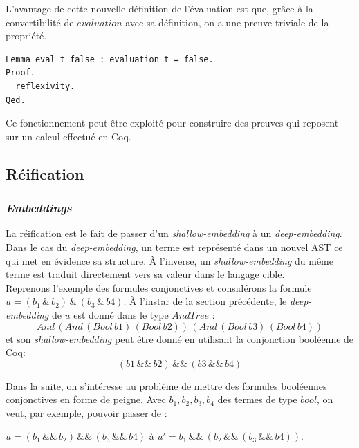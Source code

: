 \documentclass[11pt]{article}
\begin{document}
L'avantage de cette nouvelle définition de l'évaluation est que, grâce à la convertibilité de $evaluation$ avec sa définition, on a une preuve triviale de la propriété.
\begin{lstlisting}[frame=single]
Lemma eval_t_false : evaluation t = false.
Proof.
  reflexivity.
Qed.
\end{lstlisting}

Ce fonctionnement peut être exploité pour construire des preuves qui reposent sur un calcul effectué en Coq. 


\subsection{Réification} \label{reification}

\subsubsection{\textit{Embeddings}}

La réification est le fait de passer d'un \textit{shallow-embedding} à un \textit{deep-embedding}. \\

Dans le cas du \textit{deep-embedding}, un terme est représenté dans un nouvel AST ce qui met en évidence sa structure. À l'inverse, un \textit{shallow-embedding} du même terme est traduit directement vers sa valeur dans le langage cible. \\

Reprenons l'exemple des formules conjonctives et considérons la formule $ u = (b_1 \,\&\, b_2) \,\&\, (b_3 \,\&\, b4)$. À l'instar de la section précédente, le \textit{deep-embedding} de $u$ est donné dans le type $AndTree$ :
\[And\,(And\,(Bool\,b1)\,(Bool\,b2))\,(And\,(Bool\,b3)\,(Bool\,b4))\] 
et son \textit{shallow-embedding} peut être donné en utilisant la conjonction booléenne de Coq: 
\[(b1\,\&\&\,b2)\,\&\&\,(b3\,\&\&\,b4) \]

Dans la suite, on s'intéresse au problème de mettre des formules booléennes conjonctives en forme de peigne. Avec $b_1, b_2, b_3, b_4$ des termes de type $bool$, on veut, par exemple, pouvoir passer de : 
\begin{center}
$ u = (b_1 \,\&\&\, b_2) \,\&\&\, (b_3 \,\&\&\, b4)$ \hspace{1cm} à   \hspace{1cm}  $u' = b_1 \,\&\&\, (b_2 \,\&\&\, (b_3 \,\&\&\, b4)). $
\end{center}
\end{document}
